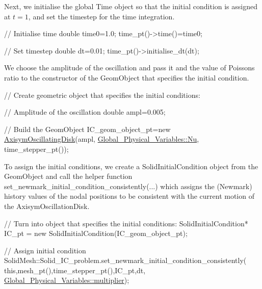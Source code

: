 Next, we initialise the global {\ttfamily Time} object so that the initial condition is assigned at $ t= 1 $, and set the timestep for the time integration.


\begin{DoxyCodeInclude}

 \textcolor{comment}{// Initialise time}
 \textcolor{keywordtype}{double} time0=1.0;
 time\_pt()->time()=time0;

 \textcolor{comment}{// Set timestep}
 \textcolor{keywordtype}{double} dt=0.01; 
 time\_pt()->initialise\_dt(dt);

\end{DoxyCodeInclude}


We choose the amplitude of the oscillation and pass it and the value of Poisson\textquotesingle{}s ratio to the constructor of the {\ttfamily Geom\+Object} that specifies the initial condition.


\begin{DoxyCodeInclude}

  \textcolor{comment}{// Create geometric object that specifies the initial conditions:}
 
 \textcolor{comment}{// Amplitude of the oscillation}
 \textcolor{keywordtype}{double} ampl=0.005;

 \textcolor{comment}{// Build the GeomObject}
 IC\_geom\_object\_pt=\textcolor{keyword}{new} \hyperlink{classAxisymOscillatingDisk}{AxisymOscillatingDisk}(ampl,
                                             \hyperlink{namespaceGlobal__Physical__Variables_a3962c36313826b19f216f6bbbdd6a477}{Global\_Physical\_Variables::Nu},
                                             time\_stepper\_pt()); 

\end{DoxyCodeInclude}


To assign the initial conditions, we create a {\ttfamily Solid\+Initial\+Condition} object from the {\ttfamily Geom\+Object} and call the helper function {\ttfamily set\+\_\+newmark\+\_\+initial\+\_\+condition\+\_\+consistently}(...) which assigns the (Newmark) history values of the nodal positions to be consistent with the current motion of the {\ttfamily Axisym\+Oscillation\+Disk}.


\begin{DoxyCodeInclude}
 
 \textcolor{comment}{// Turn into object that specifies the initial conditions:}
 SolidInitialCondition* IC\_pt = \textcolor{keyword}{new} SolidInitialCondition(IC\_geom\_object\_pt);

 \textcolor{comment}{// Assign initial condition }
 SolidMesh::Solid\_IC\_problem.set\_newmark\_initial\_condition\_consistently(
  \textcolor{keyword}{this},mesh\_pt(),time\_stepper\_pt(),IC\_pt,dt,
  \hyperlink{namespaceGlobal__Physical__Variables_a01099bce3441c7fe79ac6926800097a8}{Global\_Physical\_Variables::multiplier}); 

\end{DoxyCodeInclude}


